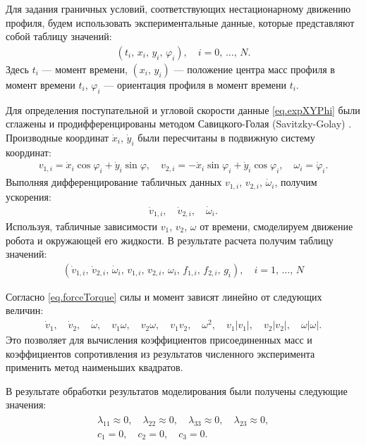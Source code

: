 Для задания граничных условий, соответствующих нестационарному движению профиля, будем использовать экспериментальные данные, которые представляют собой таблицу значений:
\begin{gather}
(t_i,\, x_i,\, y_i,\, \varphi_i),\quad i = 0,\, \ldots,\, N.\label{eq.expXYPhi}
\end{gather}
Здесь $t_i$ --- момент времени, $(x_i,\, y_i)$ --- положение центра масс профиля в момент времени $t_i$, $\varphi_i$ --- ориентация профиля в момент времени $t_i$.

Для определения поступательной и угловой скорости данные \eqref{eq.expXYPhi} были сглажены и продифференцированы методом Савицкого-Голая (Savitzky-Golay) \cite{Gorry_1990, Savitzky_Golay_1964}. Производные координат $\dot{x}_i$, $\dot{y}_i$ были пересчитаны в подвижную систему координат:
\begin{gather}
v_{1,i} = \dot{x}_i \cos\varphi_i + \dot{y}_i \sin \varphi,\quad v_{2,i} = -\dot{x}_i \sin\varphi_i + \dot{y}_i \cos\varphi_i,\quad \omega_i = \dot{\varphi}_i.
\end{gather}
Выполняя дифференцирование табличных данных $v_{1,i}$, $v_{2,i}$, $\dot{\omega}_i$, получим ускорения:
\begin{gather}
\dot{v}_{1,i},\quad \dot{v}_{2,i},\quad \dot{\omega}_i.
\end{gather}
Используя, табличные зависимости $v_1$, $v_2$, $\omega$ от времени, смоделируем движение робота и окружающей его жидкости. В результате расчета получим таблицу значений:
\begin{gather}
(\dot{v}_{1,i},\, \dot{v}_{2,i},\, \dot{\omega}_i,\, v_{1,i},\, v_{2,i},\, \omega_i,\, f_{1,i},\, f_{2,i},\, g_i),\quad i = 1,\, \ldots,\, N
\end{gather}

Согласно \eqref{eq.forceTorque} силы и момент зависят линейно от следующих величин:
\begin{gather}
\dot{v}_{1},\quad \dot{v}_{2},\quad \dot{\omega},\quad 
v_{1} \omega,\quad v_{2} \omega,\quad v_{1}v_{2},\quad \omega^2,\quad v_1 |v_1|,\quad v_2 |v_2|,\quad \omega |\omega|.
\end{gather}
Это позволяет для вычисления коэффициентов присоединенных масс и коэффициентов сопротивления из результатов численного эксперимента применить метод наименьших квадратов.

В результате обработки результатов моделирования были получены следующие значения:
\begin{gather}
\begin{gathered}
\lambda_{11} \approx 0, \quad \lambda_{22} \approx 0,\quad \lambda_{33} \approx 0,\quad \lambda_{23} \approx 0,\\
c_1 = 0,\quad c_2 = 0,\quad c_3 = 0.
\end{gathered}\label{eq.val2m}
\end{gather}

\clearpage
